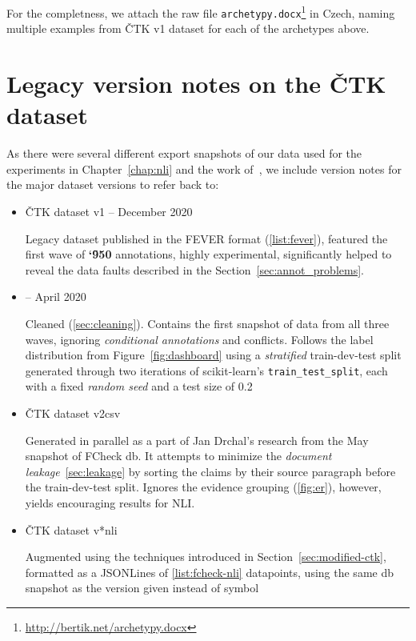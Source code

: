  For the completness, we attach the raw file \texttt{archetypy.docx}\footnote{\url{http://bertik.net/archetypy.docx}} in Czech, naming multiple examples from \textsf{ČTK v1} dataset for each of the archetypes above.

\section{Legacy version notes on the ČTK dataset}
As there were several different export snapshots of our data used for the experiments in Chapter~\ref{chap:nli} and the work of~\cite{rypar}, we include version notes for the major dataset versions to refer back to:

\begin{itemize}
    \item {\techbf ČTK dataset v1} -- December 2020
    
    Legacy dataset published in the \textsf{FEVER} format (\ref{list:fever}), featured the first wave of \textbf{\char`\~950} annotations, highly experimental, significantly helped to reveal the data faults described in the Section~\ref{sec:annot_problems}.
    
    \item {} -- April 2020
    
    Cleaned (\ref{sec:cleaning}). Contains the first snapshot of data from all three waves, ignoring \textit{conditional annotations} and conflicts. Follows the label distribution from Figure~\ref{fig:dashboard} using a \textit{stratified} \textsf{train-dev-test} split generated through two iterations of \textsf{scikit-learn}'s \texttt{train\_test\_split}, each with a fixed \textit{random seed} and a test size of 0.2
    
    \item {\techbf ČTK dataset v2csv}
    \label{item:ctk-csv}
    
    Generated in parallel as a part of Jan Drchal's research from the May snapshot of \textsf{FCheck db}. It attempts to minimize the \textit{document leakage}~\ref{sec:leakage} by sorting the claims by their source paragraph before the \textsf{train-dev-test} split. Ignores the evidence grouping (\ref{fig:er}), however, yields encouraging results for NLI.
    
    \item {\techbf ČTK dataset v*nli}
    
    Augmented using the techniques introduced in Section~\ref{sec:modified-ctk}, formatted as a \textsf{JSONLines} of \ref{list:fcheck-nli} datapoints, using the same \textsf{db} snapshot as the version given instead of {\techbf *} symbol
\end{itemize}

